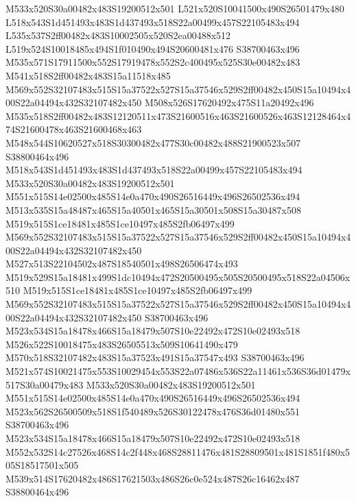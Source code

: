 \documentclass{article}
\begin{document}
\begin{multicols}{2}

M533x520S30a00482x483S19200512x501 L521x520S10041500x490S26501479x480 L518x543S1d451493x483S1d437493x518S22a00499x457S22105483x494 L535x537S2ff00482x483S10002505x520S2ea00488x512 L519x524S10018485x494S1f010490x494S20600481x476 S38700463x496 M535x571S17911500x552S17919478x552S2c400495x525S30e00482x483 M541x518S2ff00482x483S15a11518x485 M569x552S32107483x515S15a37522x527S15a37546x529S2ff00482x450S15a10494x400S22a04494x432S32107482x450 M508x526S17620492x475S11a20492x496 M535x518S2ff00482x483S12120511x473S21600516x463S21600526x463S12128464x474S21600478x463S21600468x463 M548x544S10620527x518S30300482x477S30c00482x488S21900523x507 S38800464x496 M518x543S1d451493x483S1d437493x518S22a00499x457S22105483x494 M533x520S30a00482x483S19200512x501 M551x515S14e02500x485S14e0a470x490S26516449x496S26502536x494 M513x535S15a48487x465S15a40501x465S15a30501x508S15a30487x508 M519x515S1ce18481x485S1ce10497x485S2fb06497x499 M569x552S32107483x515S15a37522x527S15a37546x529S2ff00482x450S15a10494x400S22a04494x432S32107482x450 M527x513S22104502x487S18540501x498S26506474x493 M519x529S15a18481x499S1dc10494x472S20500495x505S20500495x518S22a04506x510 M519x515S1ce18481x485S1ce10497x485S2fb06497x499 M569x552S32107483x515S15a37522x527S15a37546x529S2ff00482x450S15a10494x400S22a04494x432S32107482x450 S38700463x496 M523x534S15a18478x466S15a18479x507S10e22492x472S10e02493x518 M526x522S10018475x483S26505513x509S10641490x479 M570x518S32107482x483S15a37523x491S15a37547x493 S38700463x496 M521x574S10021475x553S10029454x553S22a07486x536S22a11461x536S36d01479x517S30a00479x483 M533x520S30a00482x483S19200512x501 M551x515S14e02500x485S14e0a470x490S26516449x496S26502536x494 M523x562S26500509x518S1f540489x526S30122478x476S36d01480x551 S38700463x496 M523x534S15a18478x466S15a18479x507S10e22492x472S10e02493x518 M552x532S14c27526x468S14c2f448x468S28811476x481S28809501x481S1851f480x505S18517501x505 M539x514S17620482x486S17621503x486S26c0e524x487S26c16462x487 S38800464x496



\end{multicols}
\end{document}
